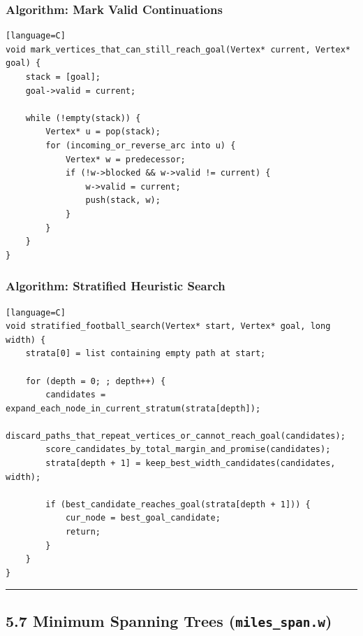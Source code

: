 \documentclass[11pt]{article}
\begin{document}
\subsubsection{Algorithm: Mark Valid Continuations}\label{algorithm-mark-valid-continuations}

\begin{verbatim}[language=C]
void mark_vertices_that_can_still_reach_goal(Vertex* current, Vertex* goal) {
    stack = [goal];
    goal->valid = current;

    while (!empty(stack)) {
        Vertex* u = pop(stack);
        for (incoming_or_reverse_arc into u) {
            Vertex* w = predecessor;
            if (!w->blocked && w->valid != current) {
                w->valid = current;
                push(stack, w);
            }
        }
    }
}
\end{verbatim}

\subsubsection{Algorithm: Stratified Heuristic Search}\label{algorithm-stratified-heuristic-search}

\begin{verbatim}[language=C]
void stratified_football_search(Vertex* start, Vertex* goal, long width) {
    strata[0] = list containing empty path at start;

    for (depth = 0; ; depth++) {
        candidates = expand_each_node_in_current_stratum(strata[depth]);
        discard_paths_that_repeat_vertices_or_cannot_reach_goal(candidates);
        score_candidates_by_total_margin_and_promise(candidates);
        strata[depth + 1] = keep_best_width_candidates(candidates, width);

        if (best_candidate_reaches_goal(strata[depth + 1])) {
            cur_node = best_goal_candidate;
            return;
        }
    }
}
\end{verbatim}

\begin{center}\rule{0.5\linewidth}{0.5pt}\end{center}

\subsection{\texorpdfstring{5.7 Minimum Spanning Trees (\texttt{miles\_span.w})}{5.7 Minimum Spanning Trees (miles\_span.w)}}\label{minimum-spanning-trees-miles_span.w}
\end{document}
